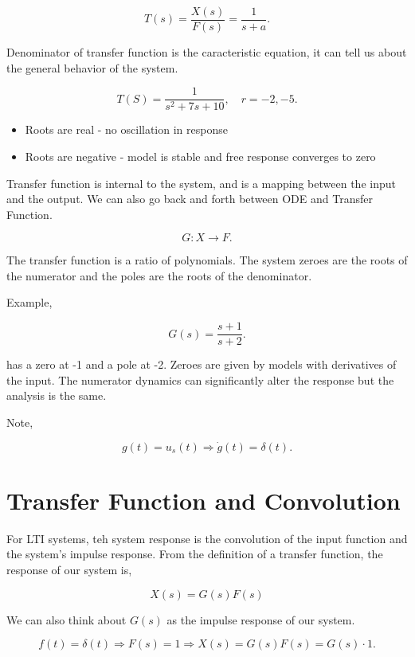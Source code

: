 \documentclass[12pt, a4paper]{report}
\begin{document}
  \[
      T(s) = \frac{X(s)}{F(s)} = \frac{1}{s+a}
    .\]

  Denominator of transfer function is the caracteristic equation, it can tell us about the general behavior of the system.

  \[
      T(S) = \frac{1}{s ^2 + 7s + 10}, \quad r = -2, -5
    .\]

  \begin{itemize}
    \item Roots are real - no oscillation in response
    \item Roots are negative - model is stable and free response converges to zero
  \end{itemize}



  Transfer function is internal to the system, and is a mapping between the input and the output. We can also go back and forth between ODE and Transfer Function.

  \[
      G: X \rightarrow F
    .\]

  The transfer function is a ratio of polynomials. The system zeroes are the roots of the numerator and the poles are the roots of the denominator.

  Example,

  \[
      G(s) = \frac{s + 1}{s + 2}
    .\]

  has a zero at -1 and a pole at -2. Zeroes are given by models with derivatives of the input. The numerator dynamics can significantly alter the response but the analysis is the same.

  Note,

  \[
      g(t) = u_s(t) \Rightarrow \dot g(t) = \delta (t)
    .\]

  \section{Transfer Function and Convolution}

  For LTI systems, teh system response is the convolution of the input function and the system's impulse response. From the definition of a transfer function, the response of our system is,

  \begin{equation}
    X(s) = G(s)F(s)
  \end{equation}

  We can also think about $ G(s) $ as the impulse response of our system.

  \[
      f(t) = \delta (t) \Rightarrow F(s) = 1 \Rightarrow X(s) = G(s)F(s) = G(s) \cdot 1
    .\]
\end{document}
